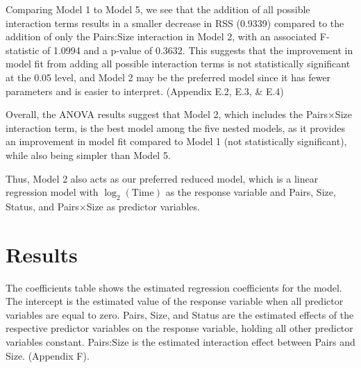 \documentclass[a4paper, 12pt]{article}
\begin{document}
\begin{spacing}{1.5}
Comparing Model 1 to Model 5, we see that the addition of all possible interaction terms results in a smaller decrease in RSS (0.9339) compared to the addition of only the Pairs:Size interaction in Model 2, with an associated F-statistic of 1.0994 and a p-value of 0.3632. This suggests that the improvement in model fit from adding all possible interaction terms is not statistically significant at the 0.05 level, and Model 2 may be the preferred model since it has fewer parameters and is easier to interpret. (Appendix E.2, E.3, \& E.4)

Overall, the ANOVA results suggest that Model 2, which includes the Pairs$\times$Size interaction term, is the best model among the five nested models, as it provides an improvement in model fit compared to Model 1 (not statistically significant), while also being simpler than Model 5.

Thus, Model 2 also acts as our preferred reduced model, which is a linear regression model with $\log_2(\text{Time})$ as the response variable and Pairs, Size, Status, and Pairs$\times$Size as predictor variables.

\section{Results}

The coefficients table shows the estimated regression coefficients for the model. The intercept is the estimated value of the response variable when all predictor variables are equal to zero. Pairs, Size, and Status are the estimated effects of the respective predictor variables on the response variable, holding all other predictor variables constant. Pairs:Size is the estimated interaction effect between Pairs and Size. (Appendix F).


\end{spacing}
\end{document}
